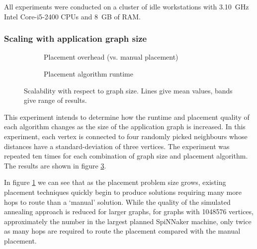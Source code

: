			All experiments were conducted on a cluster of idle workstations with
			3.10~GHz Intel Core-i5-2400 CPUs and 8~GB of RAM.
			
			\subsubsection{Scaling with application graph size}
				
				\begin{figure}
					\center
					\begin{subfigure}{\linewidth}
						\center
						
						\caption{Placement overhead (vs. manual placement)}
						\label{fig:placement-scalability-size-quality}
					\end{subfigure}
					
					\begin{subfigure}{\linewidth}
						\center
						
						\caption{Placement algorithm runtime}
						\label{fig:placement-scalability-size-runtime}
					\end{subfigure}
					
					\caption{Scalability with respect to graph size. Lines give mean
					values, bands give range of results.}
					\label{fig:placement-scalability-size}
				\end{figure}
				
				This experiment intends to determine how the runtime and placement
				quality of each algorithm changes as the size of the application graph
				is increased. In this experiment, each vertex is connected to four
				randomly picked neighbours whose distances have a standard-deviation of
				three vertices.  The experiment was repeated ten times for each
				combination of graph size and placement algorithm. The results are
				shown in figure \ref{fig:placement-scalability-size}.
				
				In figure \ref{fig:placement-scalability-size-quality} we can see that
				as the placement problem size grows, existing placement techniques
				quickly begin to produce solutions requiring many more hops to route
				than a `manual' solution. While the quality of the simulated annealing
				approach is reduced for larger graphs, for graphs with \num{1048576}
				vertices, approximately the number in the largest planned SpiNNaker
				machine, only twice as many hops are required to route the placement
				compared with the manual placement.
				
